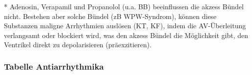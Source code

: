 
* Adenosin, Verapamil und Propanolol (u.a. BB) beeinflussen die akzess
Bündel nicht. Bestehen aber solche Bündel (zB WPW-Syndrom),
können diese Substanzen maligne Arrhythmien auslösen (KT, KF),
indem die AV-Überleitung verlangsamt oder blockiert wird, was den
akzess Bündel die Möglichkeit gibt, den Ventrikel direkt zu
depolarisieren (präexzitieren). 


\subsubsection{Tabelle Antiarrhythmika}

